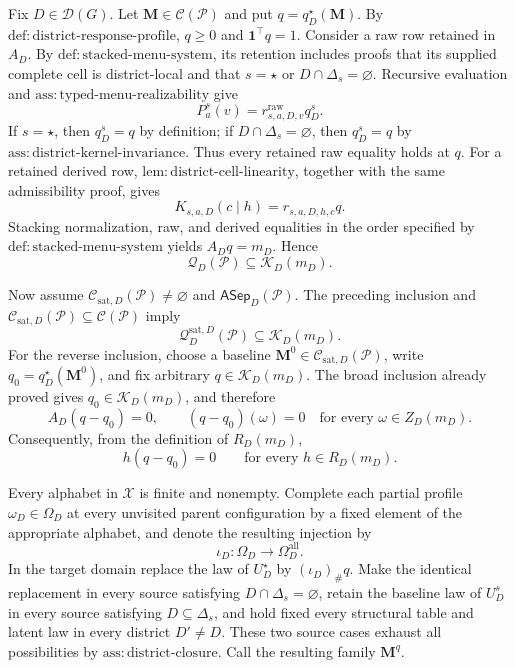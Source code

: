 Fix \(D\in\mathcal D(G)\).  Let \(\mathbf M\in\mathcal C(\mathcal P)\) and put \(q=q_D^\star(\mathbf M)\).  By \(\mathrm{def:district\text{-}response\text{-}profile}\), \(q\geq0\) and \(\mathbf 1^\top q=1\).  Consider a raw row retained in \(A_D\).  By \(\mathrm{def:stacked\text{-}menu\text{-}system}\), its retention includes proofs that its supplied complete cell is district-local and that \(s=\star\) or \(D\cap\Delta_s=\varnothing\).  Recursive evaluation and \(\mathrm{ass:typed\text{-}menu\text{-}realizability}\) give
\[
P_a^s(v)=r^{\mathrm{raw}}_{s,a,D,v}q_D^s.
\]
If \(s=\star\), then \(q_D^s=q\) by definition; if \(D\cap\Delta_s=\varnothing\), then \(q_D^s=q\) by \(\mathrm{ass:district\text{-}kernel\text{-}invariance}\).  Thus every retained raw equality holds at \(q\).  For a retained derived row, \(\mathrm{lem:district\text{-}cell\text{-}linearity}\), together with the same admissibility proof, gives
\[
K_{s,a,D}(c\mid h)=r_{s,a,D,h,c}q.
\]
Stacking normalization, raw, and derived equalities in the order specified by \(\mathrm{def:stacked\text{-}menu\text{-}system}\) yields \(A_Dq=m_D\).  Hence
\[
\mathcal Q_D(\mathcal P)\subseteq\mathcal K_D(m_D).
\]

Now assume \(\mathcal C_{\mathrm{sat},D}(\mathcal P)\ne\varnothing\) and \(\mathsf{ASep}_D(\mathcal P)\).  The preceding inclusion and \(\mathcal C_{\mathrm{sat},D}(\mathcal P)\subseteq\mathcal C(\mathcal P)\) imply
\[
\mathcal Q_D^{\mathrm{sat},D}(\mathcal P)\subseteq\mathcal K_D(m_D).
\]
For the reverse inclusion, choose a baseline \(\mathbf M^0\in\mathcal C_{\mathrm{sat},D}(\mathcal P)\), write \(q_0=q_D^\star(\mathbf M^0)\), and fix arbitrary \(q\in\mathcal K_D(m_D)\).  The broad inclusion already proved gives \(q_0\in\mathcal K_D(m_D)\), and therefore
\[
A_D(q-q_0)=0,
\qquad
(q-q_0)(\omega)=0\quad\text{for every }\omega\in Z_D(m_D).
\]
Consequently, from the definition of \(R_D(m_D)\),
\[
h(q-q_0)=0\qquad\text{for every }h\in R_D(m_D).
\tag{1}
\]

Every alphabet in \(\mathcal X\) is finite and nonempty.  Complete each partial profile \(\omega_D\in\Omega_D\) at every unvisited parent configuration by a fixed element of the appropriate alphabet, and denote the resulting injection by
\[
\iota_D:\Omega_D\longrightarrow\Omega_D^{\mathrm{all}}.
\]
In the target domain replace the law of \(U_D^\star\) by \((\iota_D)_\#q\).  Make the identical replacement in every source satisfying \(D\cap\Delta_s=\varnothing\), retain the baseline law of \(U_D^s\) in every source satisfying \(D\subseteq\Delta_s\), and hold fixed every structural table and latent law in every district \(D'\ne D\).  These two source cases exhaust all possibilities by \(\mathrm{ass:district\text{-}closure}\).  Call the resulting family \(\mathbf M^q\).

